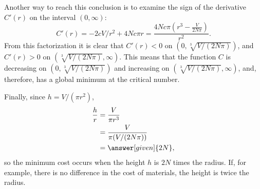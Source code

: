 \documentclass{ximera}
\begin{document}
\begin{example}
\begin{explanation}
Another way to reach this conclusion is to examine the sign of the derivative $C'(r)$ on the interval $(0,\infty)$:
\[
C'(r)=-2cV/r^2+4Nc\pi r=\frac{4Nc\pi (r^3-\frac{V}{2N\pi})}{r^2}. 
\]
From this factorization it is clear that $C'(r)<0$ on $(0,\sqrt[3]{V/(2N\pi)})$, and $C'(r)>0$ on $(\sqrt[3]{V/(2N\pi)}, \infty)$.
This means that  the function $C$ is decreasing on $(0,\sqrt[3]{V/(2N\pi)})$ and increasing on $(\sqrt[3]{V/(2N\pi)}, \infty)$, and, therefore, has a global minimum at the critical number.

Finally, since $h=V/(\pi r^2)$, 
\begin{align*}
\frac{h}{r}&=\frac{V}{\pi r^3}\\ 
&=\frac{V}{\pi(V/(2N\pi))}\\ 
&=\answer[given]{2N},
\end{align*}
so the minimum cost occurs when the height $h$ is $2N$ times the
radius. If, for example, there is no difference in the cost of
materials, the height is twice the radius.
\end{explanation}
\end{example}
\end{document}
